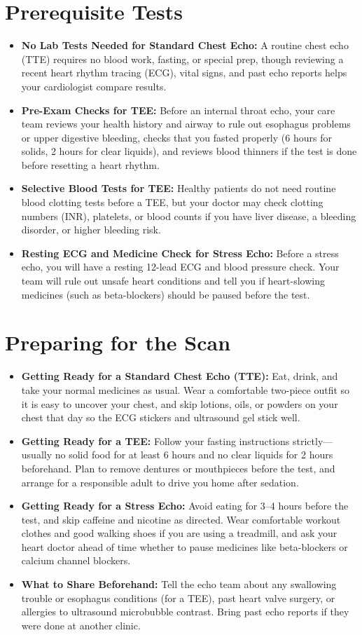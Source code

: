 \section{Prerequisite Tests}
\begin{itemize}
\item \textbf{No Lab Tests Needed for Standard Chest Echo:} A routine chest echo (TTE) requires no blood work, fasting, or special prep, though reviewing a recent heart rhythm tracing (ECG), vital signs, and past echo reports helps your cardiologist compare results.
\item \textbf{Pre-Exam Checks for TEE:} Before an internal throat echo, your care team reviews your health history and airway to rule out esophagus problems or upper digestive bleeding, checks that you fasted properly (6 hours for solids, 2 hours for clear liquids), and reviews blood thinners if the test is done before resetting a heart rhythm.
\item \textbf{Selective Blood Tests for TEE:} Healthy patients do not need routine blood clotting tests before a TEE, but your doctor may check clotting numbers (INR), platelets, or blood counts if you have liver disease, a bleeding disorder, or higher bleeding risk.
\item \textbf{Resting ECG and Medicine Check for Stress Echo:} Before a stress echo, you will have a resting 12-lead ECG and blood pressure check. Your team will rule out unsafe heart conditions and tell you if heart-slowing medicines (such as beta-blockers) should be paused before the test.
\end{itemize}

\section{Preparing for the Scan}
\begin{itemize}
\item \textbf{Getting Ready for a Standard Chest Echo (TTE):} Eat, drink, and take your normal medicines as usual. Wear a comfortable two-piece outfit so it is easy to uncover your chest, and skip lotions, oils, or powders on your chest that day so the ECG stickers and ultrasound gel stick well.
\item \textbf{Getting Ready for a TEE:} Follow your fasting instructions strictly---usually no solid food for at least 6 hours and no clear liquids for 2 hours beforehand. Plan to remove dentures or mouthpieces before the test, and arrange for a responsible adult to drive you home after sedation.
\item \textbf{Getting Ready for a Stress Echo:} Avoid eating for 3--4 hours before the test, and skip caffeine and nicotine as directed. Wear comfortable workout clothes and good walking shoes if you are using a treadmill, and ask your heart doctor ahead of time whether to pause medicines like beta-blockers or calcium channel blockers.
\item \textbf{What to Share Beforehand:} Tell the echo team about any swallowing trouble or esophagus conditions (for a TEE), past heart valve surgery, or allergies to ultrasound microbubble contrast. Bring past echo reports if they were done at another clinic.
\end{itemize}

